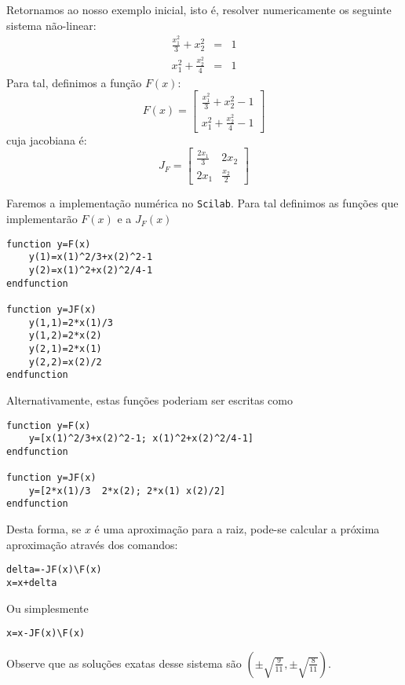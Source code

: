 \documentclass[main.tex]{subfiles}
\begin{document}
\begin{ex} Retornamos ao nosso exemplo inicial, isto é, resolver numericamente os seguinte sistema não-linear:
\begin{eqnarray*}
\frac{x_1^2}{3}+x_2^2&=&1\\
x_1^2+\frac{x_2^2}{4}&=&1
\end{eqnarray*}
Para tal, definimos a função $F(x)$:
\begin{equation*}
  F(x)=\left[
\begin{array}{c}
\displaystyle \frac{x_1^2}{3}+x_2^2-1\\
\displaystyle x_1^2+\frac{x_2^2}{4}-1
\end{array}
\right]
\end{equation*}
cuja jacobiana é:
\begin{equation*}
  J_F=\left[\begin{array}{cc}
      \displaystyle \frac{2x_1}{3} & 2x_2\\
      \displaystyle 2x_1&\frac{x_2}{2}
    \end{array}\right]
\end{equation*}

\ifisscilab
Faremos a implementação numérica no \verb+Scilab+. Para tal definimos as funções que implementarão $F(x)$ e a $J_F(x)$
\begin{verbatim}
function y=F(x)
    y(1)=x(1)^2/3+x(2)^2-1
    y(2)=x(1)^2+x(2)^2/4-1
endfunction

function y=JF(x)
    y(1,1)=2*x(1)/3
    y(1,2)=2*x(2)
    y(2,1)=2*x(1)
    y(2,2)=x(2)/2
endfunction
\end{verbatim}
Alternativamente, estas funções poderiam ser escritas como
\begin{verbatim}
function y=F(x)
    y=[x(1)^2/3+x(2)^2-1; x(1)^2+x(2)^2/4-1]
endfunction

function y=JF(x)
    y=[2*x(1)/3  2*x(2); 2*x(1) x(2)/2]
endfunction
\end{verbatim}
Desta forma, se $x$ é uma aproximação para a raiz, pode-se calcular a próxima aproximação através dos comandos:
\begin{verbatim}
delta=-JF(x)\F(x)
x=x+delta
\end{verbatim}
Ou simplesmente
\begin{verbatim}
x=x-JF(x)\F(x)
\end{verbatim}
\fi
Observe que as soluções exatas desse sistema são $\left(\pm \sqrt{\frac{9}{11}},\pm \sqrt{\frac{8}{11}}\right)$.
\end{ex}
\end{document}
